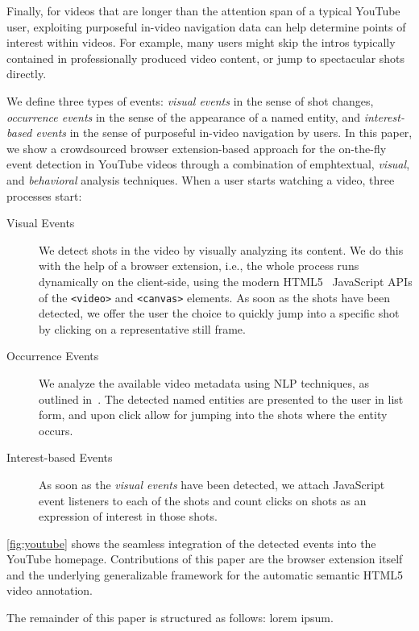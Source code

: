 \documentclass[runningheads,a4paper]{llncs}
\begin{document}
Finally, for videos that are longer than the attention span of a typical YouTube user, exploiting purposeful in-video navigation data can help determine points of interest within videos. For example, many users might skip the intros typically contained in professionally produced video content, or jump to spectacular shots directly. 

We define three types of events: \emph{visual events} in the sense of shot changes, \emph{occurrence events} in the sense of the appearance of a named entity, and \emph{interest-based events} in the sense of purposeful in-video navigation by users. In this paper, we show a crowdsourced browser extension-based  approach for the on-the-fly event detection in YouTube videos through a combination of emph{textual}, \emph{visual}, and \emph{behavioral} analysis techniques. When a user starts watching a video, three processes start:

\begin{description}
  \item[Visual Events] We detect shots in the video by visually analyzing its content. We do this with the help of a browser extension, i.e., the whole process runs dynamically on the client-side, using the modern HTML5~\cite{w3c_html5} JavaScript APIs of the \texttt{<video>} and \texttt{<canvas>} elements. As soon as the shots have been detected, we offer the user the choice to quickly jump into a specific shot by clicking on a representative still frame.
  \item[Occurrence Events] We analyze the available video metadata using NLP techniques, as outlined in~\cite{semwebvid}. The detected named entities are presented to the user in list form, and upon click allow for jumping into the  shots where the entity occurs.
  \item[Interest-based Events] As soon as the \emph{visual events} have been detected, we attach JavaScript event listeners to each of the shots and count clicks on shots as an expression of interest in those shots.
\end{description} 
 
\autoref{fig:youtube} shows the seamless integration of the detected events into the YouTube homepage. Contributions of this paper are the browser extension itself and the underlying generalizable framework for the automatic semantic HTML5 video annotation.

The remainder of this paper is structured as follows: lorem ipsum.
\end{document}
